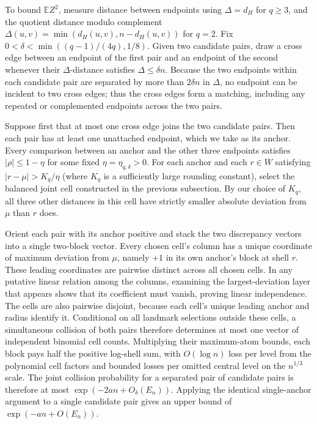 To bound $\mathbb EZ^2$, measure distance between endpoints using $\Delta=d_H$ for $q\ge3$, and the quotient distance modulo complement $\Delta(u,v)=\min(d_H(u,v),n-d_H(u,v))$ for $q=2$. Fix $0<\delta<\min((q-1)/(4q),1/8)$. Given two candidate pairs, draw a cross edge between an endpoint of the first pair and an endpoint of the second whenever their $\Delta$-distance satisfies $\Delta\le\delta n$. Because the two endpoints within each candidate pair are separated by more than $2\delta n$ in $\Delta$, no endpoint can be incident to two cross edges; thus the cross edges form a matching, including any repeated or complemented endpoints across the two pairs.

Suppose first that at most one cross edge joins the two candidate pairs. Then each pair has at least one unattached endpoint, which we take as its anchor. Every comparison between an anchor and the other three endpoints satisfies $|\rho|\le1-\eta$ for some fixed $\eta=\eta_{q,\delta}>0$. For each anchor and each $r\in W$ satisfying $|r-\mu|>K_q/\eta$ (where $K_q$ is a sufficiently large rounding constant), select the balanced joint cell constructed in the previous subsection. By our choice of $K_q$, all three other distances in this cell have strictly smaller absolute deviation from $\mu$ than $r$ does.

Orient each pair with its anchor positive and stack the two discrepancy vectors into a single two-block vector. Every chosen cell's column has a unique coordinate of maximum deviation from $\mu$, namely $+1$ in its own anchor's block at shell $r$. These leading coordinates are pairwise distinct across all chosen cells. In any putative linear relation among the columns, examining the largest-deviation layer that appears shows that its coefficient must vanish, proving linear independence. The cells are also pairwise disjoint, because each cell's unique leading anchor and radius identify it. Conditional on all landmark selections outside these cells, a simultaneous collision of both pairs therefore determines at most one vector of independent binomial cell counts. Multiplying their maximum-atom bounds, each block pays half the positive log-shell sum, with $O(\log n)$ loss per level from the polynomial cell factors and bounded losses per omitted central level on the $n^{1/3}$ scale. The joint collision probability for a separated pair of candidate pairs is therefore at most $\exp(-2an+O_\delta(E_n))$. Applying the identical single-anchor argument to a single candidate pair gives an upper bound of $\exp(-an+O(E_n))$.

